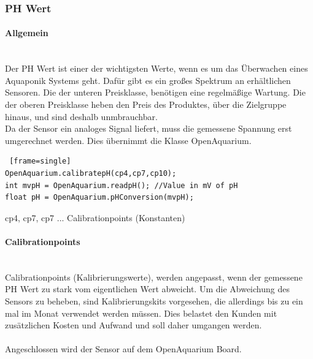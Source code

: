 \subsubsection{PH Wert}
\paragraph{Allgemein} \mbox{} \\
Der PH Wert ist einer der wichtigsten Werte, wenn es um das \"Uberwachen eines Aquaponik Systems geht. Daf\"ur gibt es ein gro{\ss}es Spektrum an erh\"altlichen Sensoren. Die der unteren Preisklasse, ben\"otigen eine regelm\"a{\ss}ige Wartung. Die der oberen Preisklasse heben den Preis des Produktes, \"uber die Zielgruppe hinaus, und sind deshalb unmbrauchbar. \\
Da der Sensor ein analoges Signal liefert, muss die gemessene Spannung erst umgerechnet werden. Dies \"ubernimmt die Klasse OpenAquarium.

\begin{lstlisting} [frame=single]
OpenAquarium.calibratepH(cp4,cp7,cp10);
int mvpH = OpenAquarium.readpH(); //Value in mV of pH
float pH = OpenAquarium.pHConversion(mvpH);
\end{lstlisting}
cp4, cp7, cp7 ... Calibrationpoints (Konstanten)

\paragraph{Calibrationpoints} \mbox{} \\
Calibrationpoints (Kalibrierungswerte), werden angepasst, wenn der gemessene PH Wert zu stark vom eigentlichen Wert abweicht. Um die Abweichung des Sensors zu beheben, sind Kalibrierungskits vorgesehen, die allerdings bis zu ein mal im Monat verwendet werden m\"ussen. Dies belastet den Kunden mit zus\"atzlichen Kosten und Aufwand und soll daher umgangen werden. \\ \mbox{} \\
Angeschlossen wird der Sensor auf dem OpenAquarium Board. \\
\begin{minipage}{5in}
  \centering
\end{minipage}

